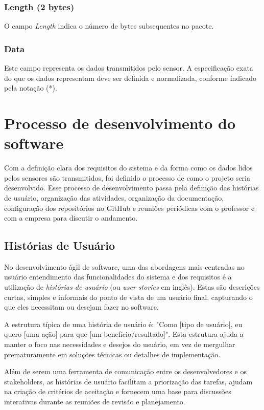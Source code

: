 \subsubsection{Length (2 bytes)}

O campo \textit{Length} indica o número de bytes subsequentes no pacote.

\subsubsection{Data}

Este campo representa os dados transmitidos pelo sensor. A especificação exata do que os dados representam deve ser definida e normalizada, conforme indicado pela notação (*).


\section[Processo de desenvolvimento do software]{Processo de desenvolvimento do software}
Com a definição clara dos requisitos do sistema e da forma como os dados lidos pelos sensores são transmitidos, foi definido o processo de como o projeto seria desenvolvido. Esse processo de desenvolvimento passa pela definição das histórias de usuário, organização das atividades, organização da documentação, configuração dos repositórios no GitHub e reuniões periódicas com o professor e com a empresa para discutir o andamento.

\subsection{Histórias de Usuário}
No desenvolvimento ágil de software, uma das abordagens mais centradas no usuário entendimento das funcionalidades do sistema e dos requisitos é a utilização de \textit{histórias de usuário} (ou \textit{user stories} em inglês). Estas são descrições curtas, simples e informais do ponto de vista de um usuário final, capturando o que eles necessitam ou desejam fazer no software.

A estrutura típica de uma história de usuário é: "Como [tipo de usuário], eu quero [uma ação] para que [um benefício/resultado]". Esta estrutura ajuda a manter o foco nas necessidades e desejos do usuário, em vez de mergulhar prematuramente em soluções técnicas ou detalhes de implementação.

Além de serem uma ferramenta de comunicação entre os desenvolvedores e os stakeholders, as histórias de usuário facilitam a priorização das tarefas, ajudam na criação de critérios de aceitação e fornecem uma base para discussões interativas durante as reuniões de revisão e planejamento.

